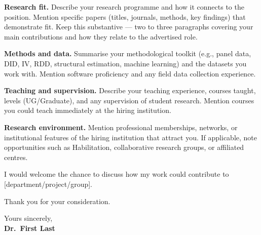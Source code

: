 \documentclass[11pt,english]{article}
\begin{document}
\vspace{0.1in}

\textbf{Research fit.}
Describe your research programme and how it connects to the position. Mention specific papers (titles, journals, methods, key findings) that demonstrate fit. Keep this substantive --- two to three paragraphs covering your main contributions and how they relate to the advertised role.

\vspace{0.1in}

\textbf{Methods and data.}
Summarise your methodological toolkit (e.g., panel data, DID, IV, RDD, structural estimation, machine learning) and the datasets you work with. Mention software proficiency and any field data collection experience.

\vspace{0.1in}

\textbf{Teaching and supervision.}
Describe your teaching experience, courses taught, levels (UG/Graduate), and any supervision of student research. Mention courses you could teach immediately at the hiring institution.

\vspace{0.1in}

\textbf{Research environment.}
Mention professional memberships, networks, or institutional features of the hiring institution that attract you. If applicable, note opportunities such as Habilitation, collaborative research groups, or affiliated centres.

\vspace{0.1in}

I would welcome the chance to discuss how my work could contribute to [department/project/group].

Thank you for your consideration.

\vspace{0.2in}

Yours sincerely, \\
\textbf{Dr.\ First Last}
\end{document}
